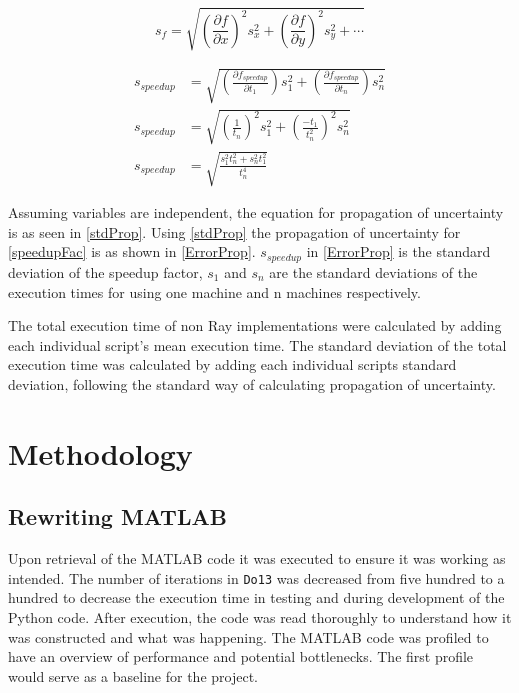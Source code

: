 \documentclass[12pt, a4paper]{article}
\begin{document}
\begin{equation}\label{stdProp}
    s_f = \sqrt{\left(\frac{\partial f}{\partial x}\right)^2s_x^2 + \left(\frac{\partial f}{\partial y}\right)^2s_y^2 + \cdots}
\end{equation}

\begin{equation}\label{ErrorProp}
    \begin{aligned}
        s_{speedup} &=  \sqrt{\left(\frac{\partial f_{speedup}}{\partial t_1}\right)s_1^2 + \left(\frac{\partial f_{speedup}}{\partial t_n}\right)s_n^2} \\
        s_{speedup} &= \sqrt{\left(\frac{1}{t_n}\right)^2s_1^2 + \left(\frac{-t_1}{t_n^2}\right)^2s_n^2}\\
        s_{speedup} &= \sqrt{\frac{s_{1}^2t_n^2 + s_{n}^2t_1^2}{t_n^4}}
    \end{aligned}
\end{equation}

Assuming variables are independent, the equation for propagation of uncertainty is as seen in \cref{stdProp}.
Using \cref{stdProp} the propagation of uncertainty for \cref{speedupFac} is as shown in \cref{ErrorProp}.
$s_{speedup}$ in \cref{ErrorProp} is the standard deviation of the speedup factor, $s_1$ and $s_n$ are the standard deviations of the execution times for using one machine and n machines respectively.

The total execution time of non Ray implementations were calculated by adding each individual script's mean execution time.
The standard deviation of the total execution time was calculated by adding each individual scripts standard deviation, following the standard way of calculating propagation of uncertainty.

\section{Methodology}

\subsection{Rewriting MATLAB}

Upon retrieval of the MATLAB code it was executed to ensure it was working as intended.
The number of iterations in \texttt{Do13} was decreased from five hundred to a hundred to decrease the execution time in testing and during development of the Python code.
After execution, the code was read thoroughly to understand how it was constructed and what was happening.
The MATLAB code was profiled to have an overview of performance and potential bottlenecks.
The first profile would serve as a baseline for the project.
\end{document}
